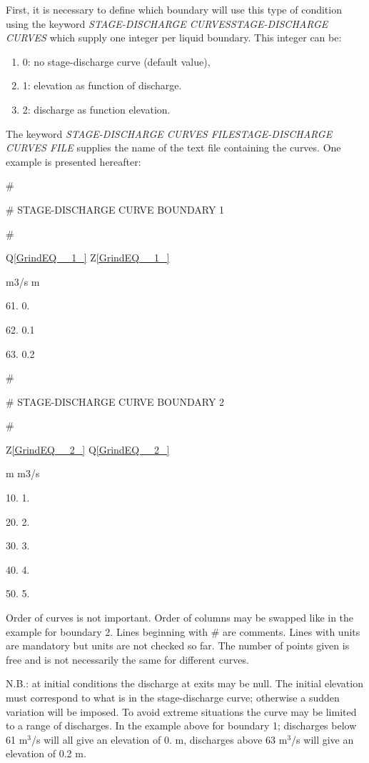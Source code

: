 \documentclass{article} %
\begin{document}
 First, it is necessary to define which boundary will use this type of condition using the keyword \textit{STAGE-DISCHARGE CURVESSTAGE-DISCHARGE CURVES} which supply one integer per liquid boundary. This integer can be:

\begin{enumerate}
\item  0: no stage-discharge curve (default value),

\item  1: elevation as function of discharge.

\item  2: discharge as function elevation.
\end{enumerate}

 The keyword \textit{STAGE-DISCHARGE CURVES FILESTAGE-DISCHARGE CURVES FILE} supplies the name of the text file containing the curves. One example is presented hereafter:

 \#

 \#  STAGE-DISCHARGE CURVE BOUNDARY 1

 \#

 Q\eqref{GrindEQ__1_}     Z\eqref{GrindEQ__1_}

 m3/s      m

 61.       0.

 62.       0.1

 63.       0.2

 \#

 \#  STAGE-DISCHARGE CURVE BOUNDARY 2

 \#

 Z\eqref{GrindEQ__2_}     Q\eqref{GrindEQ__2_}

 m      m3/s

 10.       1.

 20.       2.

 30.       3.

 40.       4.

 50.       5.

 Order of curves is not important. Order of columns may be swapped like in the example for boundary 2. Lines beginning with \# are comments. Lines with units are mandatory but units are not checked so far. The number of points given is free and is not necessarily the same for different curves.

 N.B.: at initial conditions the discharge at exits may be null. The initial elevation must correspond to what is in the stage-discharge curve; otherwise a sudden variation will be imposed. To avoid extreme situations the curve may be limited to a range of discharges. In the example above for boundary 1; discharges below 61 m${}^{3}$/s will all give an elevation of 0. m, discharges above 63 m${}^{3}$/s will give an elevation of 0.2 m.
\end{document}
